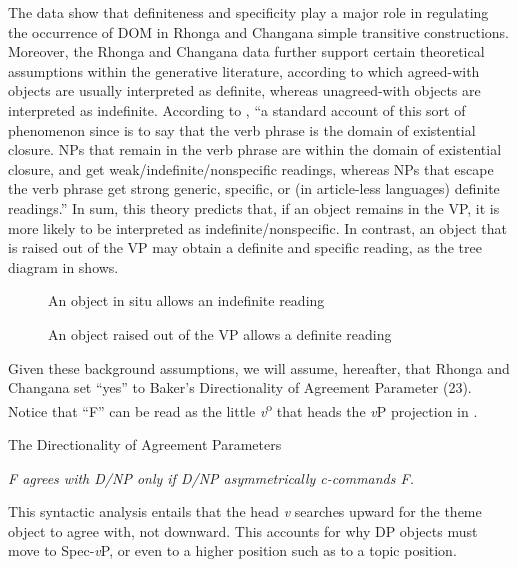 \documentclass[output=paper]{langsci/langscibook}
\begin{document}
The data show that definiteness and specificity play a major role in regulating the occurrence of DOM in Rhonga and Changana simple transitive constructions. Moreover, the Rhonga and Changana data further support certain theoretical assumptions within the generative literature, according to which agreed-with objects are usually interpreted as definite, whereas unagreed-with objects are interpreted as indefinite. According to \citet[199]{Baker2008}, “a standard account of this sort of phenomenon since \citet{Diesing1992} is to say that the verb phrase is the domain of existential closure. NPs that remain in the verb phrase are within the domain of existential closure, and get weak/indefinite/nonspecific readings, whereas NPs that escape the verb phrase get strong generic, specific, or (in article-less languages) definite readings.” In sum, this theory predicts that, if an object remains in the VP, it is more likely to be interpreted as indefinite/nonspecific. In contrast, an object that is raised out of the VP may obtain a definite and specific reading, as the tree diagram in  shows.


\begin{figure}
\caption{An object in situ allows an indefinite reading}
 \label{fig:1}
\end{figure}

  
\begin{figure}
 

\caption{An object raised out of the VP allows a definite reading}
\label{fig:2}
\end{figure}

Given these background assumptions, we will assume, hereafter, that Rhonga and Changana set “yes” to Baker’s Directionality of Agreement Parameter (23). Notice that “F” can be read as the little \textit{v}\textsuperscript{o} that heads the {\textit{v}}P projection in .

{The Directionality of Agreement Parameters \citep[155]{Baker2008}}

{\textit{F agrees with D/NP only if D/NP asymmetrically c-commands F.}}

This syntactic analysis entails that the head {\textit{v}} searches upward for the theme object to agree with, not downward. This accounts for why DP objects must move to Spec-{\textit{v}}P, or even to a higher position such as to a topic position.
\end{document}
